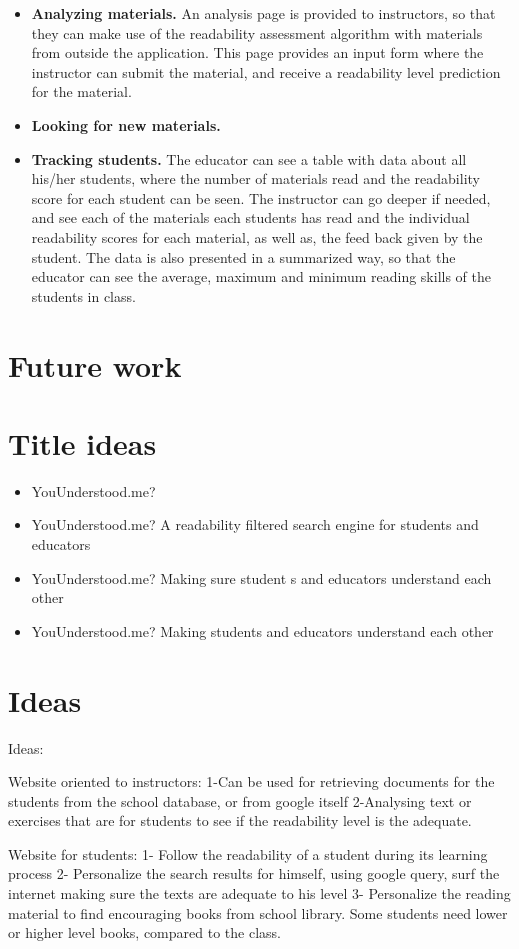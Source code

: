 \documentclass{sig-alternate-05-2015}
\begin{document}
\begin{itemize}
\item \textbf{Analyzing materials.} An analysis page is provided to instructors, so that they can make use of the readability assessment algorithm with materials from outside the application. This page provides an input form where the instructor can submit the material, and receive a readability level prediction for the material.
\item \textbf{Looking for new materials.} 



\item \textbf{Tracking students.} The educator can see a table with data about all his/her students, where the number of materials read and the readability score for each student can be seen. The instructor can go deeper if needed, and see each of the materials each students has read and the individual readability scores for each material, as well as, the feed back given by the student. The data is also presented in a summarized way, so that the educator can see the average, maximum and minimum reading skills of the students in class.

\end{itemize}


\section{Future work}

{\color{red}
\section{Title ideas}
\begin{itemize}
\item YouUnderstood.me?
\item YouUnderstood.me? A readability filtered search engine for students and educators
\item  YouUnderstood.me? Making sure student s and educators understand each other
\item  YouUnderstood.me? Making students and educators understand each other
\end{itemize}


}
{\color{red}
\section{Ideas}
Ideas:

Website oriented to instructors:
1-Can be used for retrieving documents for the students from the school database, or from google itself
2-Analysing text or exercises that are for students to see if the readability level is the adequate.

Website for students:
1- Follow the readability of a student during its learning process
2- Personalize the search results for himself, using google query, surf the internet making sure the texts are adequate to his level
3- Personalize the reading material to find encouraging books from school library. Some students need lower or higher level books, compared to the class.

}

{}

\end{document}

